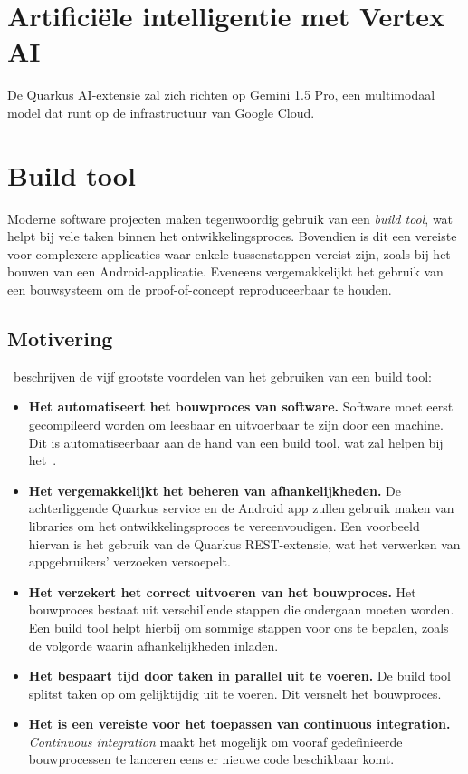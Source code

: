 \section{Artificiële intelligentie met Vertex AI}
\label{sec:keuze-ai-platform}
De Quarkus AI-extensie zal zich richten op Gemini 1.5 Pro, een multimodaal model dat runt op de infrastructuur van Google Cloud.


\section{Build tool}
\label{sec:build-tool}
Moderne software projecten maken tegenwoordig gebruik van een \textit{build tool}, wat helpt bij vele taken binnen het ontwikkelingsproces.
Bovendien is dit een vereiste voor complexere applicaties waar enkele tussenstappen vereist zijn, zoals bij het bouwen van een Android-applicatie.
Eveneens vergemakkelijkt het gebruik van een bouwsysteem om de proof-of-concept reproduceerbaar te houden.

\subsection{Motivering}
\label{subsec:voordelen-van-een-build-tool}
\textcite{Kandhway2019}~beschrijven de vijf grootste voordelen van het gebruiken van een build tool:
\begin{itemize}
    \item \textbf{Het automatiseert het bouwproces van software.}
    Software moet eerst gecompileerd worden om leesbaar en uitvoerbaar te zijn door een machine.
    Dit is automatiseerbaar aan de hand van een build tool, wat zal helpen bij het~.
    \item \textbf{Het vergemakkelijkt het beheren van afhankelijkheden.}
    De achterliggende Quarkus service en de Android app zullen gebruik maken van libraries om het ontwikkelingsproces te vereenvoudigen.
    Een voorbeeld hiervan is het gebruik van de Quarkus REST-extensie, wat het verwerken van appgebruikers' verzoeken versoepelt.
    \item \textbf{Het verzekert het correct uitvoeren van het bouwproces.}
    Het bouwproces bestaat uit verschillende stappen die ondergaan moeten worden.
    Een build tool helpt hierbij om sommige stappen voor ons te bepalen, zoals de volgorde waarin afhankelijkheden inladen.
    \item \textbf{Het bespaart tijd door taken in parallel uit te voeren.}
    De build tool splitst taken op om gelijktijdig uit te voeren.
    Dit versnelt het bouwproces.
    \item \textbf{Het is een vereiste voor het toepassen van continuous integration.}
    \textit{Continuous integration} maakt het mogelijk om vooraf gedefinieerde bouwprocessen te lanceren eens er nieuwe code beschikbaar komt.
\end{itemize}

